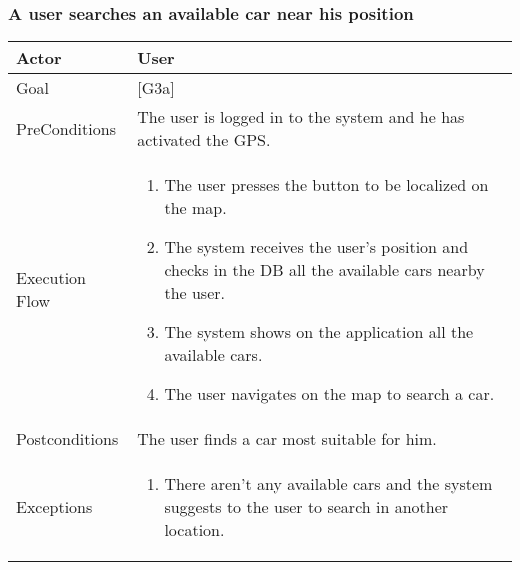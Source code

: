 \documentclass{article}
\begin{document}
	\subsubsection{A user searches an available car near his position}
	\begin{tabularx}{\textwidth}{  l  X  }
		\hline
		Actor & User\\
		\hline
		Goal & [G3a]\\
		\hline
		PreConditions & The user is logged in to the system and he has activated the GPS.\\
		\hline
		Execution Flow & \begin{enumerate}
			\item{The user presses the button to be localized on the map.}
										 \item{The system receives the user's position and checks in the DB all the available cars nearby the user.}
										 \item{The system shows on the application all the available cars.}
										 \item{The user navigates on the map to search a car.}
										\end{enumerate}\\
		\hline
		Postconditions & The user finds a car most suitable for him.\\
		\hline
		Exceptions & \begin{enumerate}
			\item{There aren't any available cars and the system suggests to the user to search in another location.}
			\end{enumerate}\\
		\hline
	\end{tabularx}
\end{document}
